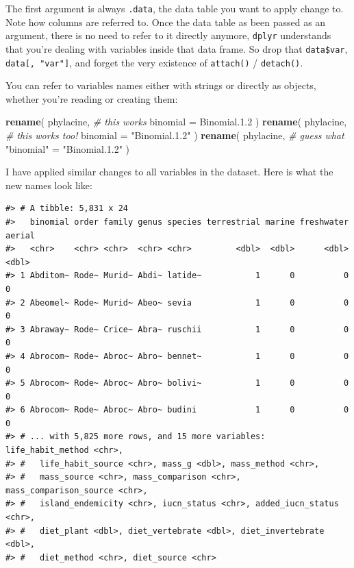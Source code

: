 \documentclass[]{book}
\newenvironment{Shaded}{}{}
\newcommand{\CommentTok}[1]{\textcolor[rgb]{0.38,0.63,0.69}{\textit{#1}}}
\newcommand{\DataTypeTok}[1]{\textcolor[rgb]{0.56,0.13,0.00}{#1}}
\newcommand{\FloatTok}[1]{\textcolor[rgb]{0.25,0.63,0.44}{#1}}
\newcommand{\KeywordTok}[1]{\textcolor[rgb]{0.00,0.44,0.13}{\textbf{#1}}}
\newcommand{\NormalTok}[1]{#1}
\newcommand{\StringTok}[1]{\textcolor[rgb]{0.25,0.44,0.63}{#1}}
\begin{document}
The first argument is always \texttt{.data}, the data table you want to apply change to.
Note how columns are referred to. Once the data table as been passed as an
argument, there is no need to refer to it directly anymore, \texttt{dplyr} understands
that you're dealing with variables inside that data frame. So drop that
\texttt{data\$var}, \texttt{data{[},\ "var"{]}}, and forget the very existence of \texttt{attach()} /
\texttt{detach()}.

You can refer to variables names either with strings or directly as objects,
whether you're reading or creating them:

\begin{Shaded}
\begin{Highlighting}[]
\KeywordTok{rename}\NormalTok{(}
\NormalTok{  phylacine,}
  \CommentTok{# this works}
  \DataTypeTok{binomial =}\NormalTok{ Binomial.}\FloatTok{1.2}
\NormalTok{)}
\KeywordTok{rename}\NormalTok{(}
\NormalTok{  phylacine,}
  \CommentTok{# this works too!}
  \DataTypeTok{binomial =} \StringTok{"Binomial.1.2"}
\NormalTok{)}
\KeywordTok{rename}\NormalTok{(}
\NormalTok{  phylacine,}
  \CommentTok{# guess what}
  \StringTok{"binomial"}\NormalTok{ =}\StringTok{ "Binomial.1.2"}
\NormalTok{)}
\end{Highlighting}
\end{Shaded}

I have applied similar changes to all variables in the dataset. Here is what the
new names look like:

\begin{verbatim}
#> # A tibble: 5,831 x 24
#>   binomial order family genus species terrestrial marine freshwater aerial
#>   <chr>    <chr> <chr>  <chr> <chr>         <dbl>  <dbl>      <dbl>  <dbl>
#> 1 Abditom~ Rode~ Murid~ Abdi~ latide~           1      0          0      0
#> 2 Abeomel~ Rode~ Murid~ Abeo~ sevia             1      0          0      0
#> 3 Abraway~ Rode~ Crice~ Abra~ ruschii           1      0          0      0
#> 4 Abrocom~ Rode~ Abroc~ Abro~ bennet~           1      0          0      0
#> 5 Abrocom~ Rode~ Abroc~ Abro~ bolivi~           1      0          0      0
#> 6 Abrocom~ Rode~ Abroc~ Abro~ budini            1      0          0      0
#> # ... with 5,825 more rows, and 15 more variables: life_habit_method <chr>,
#> #   life_habit_source <chr>, mass_g <dbl>, mass_method <chr>,
#> #   mass_source <chr>, mass_comparison <chr>, mass_comparison_source <chr>,
#> #   island_endemicity <chr>, iucn_status <chr>, added_iucn_status <chr>,
#> #   diet_plant <dbl>, diet_vertebrate <dbl>, diet_invertebrate <dbl>,
#> #   diet_method <chr>, diet_source <chr>
\end{verbatim}
\end{document}
